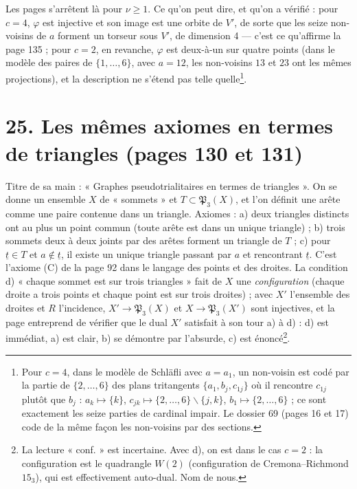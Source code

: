 \documentclass[11pt,a4paper]{article}
\begin{document}
Les pages s'arrêtent là pour $\nu \geq 1$. Ce qu'on peut dire, et qu'on a
vérifié : pour $c = 4$, $\varphi$ est injective et son image est une orbite de
$V'$, de sorte que les seize non-voisins de $a$ forment un torseur sous $V'$, de
dimension 4 --- c'est ce qu'affirme la page 135 ; pour $c = 2$, en revanche,
$\varphi$ est deux-à-un sur quatre points (dans le modèle des paires de
$\lbrace 1, \ldots, 6\rbrace$, avec $a = 12$, les non-voisins $13$ et $23$ ont les mêmes
projections), et la description ne s'étend pas telle quelle\footnote{Pour $c
= 4$, dans le modèle de Schläfli avec $a = a_1$, un non-voisin est codé par la
partie de $\lbrace 2, \ldots, 6\rbrace$ des plans tritangents $\lbrace a_1, b_j,
c_{1j}\rbrace$ où il rencontre $c_{1j}$ plutôt que $b_j$ : $a_k \mapsto \lbrace
k\rbrace$, $c_{jk} \mapsto \lbrace 2, \ldots, 6\rbrace \smallsetminus \lbrace j,
k\rbrace$, $b_1 \mapsto \lbrace 2, \ldots, 6\rbrace$ ; ce sont exactement les seize
parties de cardinal impair. Le dossier 69 (pages 16 et 17) code de la même
façon les non-voisins par des sections.}.

\section*{25. Les mêmes axiomes en termes de triangles (pages 130 et 131)}

Titre de sa main : « Graphes pseudotrialitaires en termes de triangles ». On se
donne un ensemble $X$ de « sommets » et $T \subset \mathfrak{P}_3(X)$, et l'on
définit une arête comme une paire contenue dans un triangle. Axiomes : a) deux
triangles distincts ont au plus un point commun (toute arête est dans un unique
triangle) ; b) trois sommets deux à deux joints par des arêtes forment un triangle
de $T$ ; c) pour $\underline t \in T$ et $a \notin \underline t$, il existe un
unique triangle passant par $a$ et rencontrant $\underline t$. C'est l'axiome (C)
de la page 92 dans le langage des points et des droites. La condition d)
« chaque sommet est sur trois triangles » fait de $X$ une \emph{configuration}
(chaque droite a trois points et chaque point est sur trois droites) ; avec
$X'$ l'ensemble des droites et $R$ l'incidence, $X' \to \mathfrak{P}_3(X)$ et $X
\to \mathfrak{P}_3(X')$ sont injectives, et la page entreprend de vérifier que le
dual $X'$ satisfait à son tour a) à d) : d) est immédiat, a) est clair, b) se
démontre par l'absurde, c) est énoncé\footnote{La lecture « conf. » est
incertaine. Avec d), on est dans le cas $c = 2$ : la configuration est le
quadrangle $W(2)$ (configuration de Cremona--Richmond $15_3$), qui est
effectivement auto-dual. Nom de nous.}.
\end{document}
